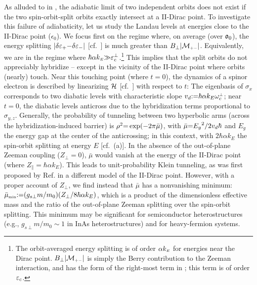 \documentclass[aps, showpacs, twocolumn, notitlepage, superscriptaddress]{revtex4-1}
\begin{document}
As alluded to in , the adiabatic limit of two independent orbits does not exist if the two spin-orbit-split orbits exactly intersect at a II-Dirac point. To investigate this failure of adiabaticity, let us study the Landau levels at energies close to the II-Dirac point ($\epsilon_0$). We focus first on the regime where, on average (over $\mathfrak{o}_0$), the energy splitting $|\delta \varepsilon_+{-}\delta \varepsilon_-|$ [cf.\ ] is much greater than $B_\perp|{\cal M}_{\scriptscriptstyle{+-}}|$. Equivalently, we are in the regime where $\hbar\alpha k_{\scriptscriptstyle{E}}{\gg}\varepsilon_c^\perp$.\footnote{The orbit-averaged energy splitting is of order $\alpha k_{\scriptscriptstyle{E}}$ for energies near the Dirac point. $B_\perp|{\cal M}_{\scriptscriptstyle{+-}}|$ is simply the Berry contribution to the Zeeman interaction, and has the form of the right-most term in ; this term is of order $\varepsilon_c$.} This implies that the split orbits do not appreciably hybridize -- except in the vicinity of the II-Dirac point where orbits (nearly) touch.  Near this touching point (where $t{=}0$), the dynamics of a spinor electron is described by linearizing $\mathcal{H}$ [cf.\ ] with respect to $t$:
The eigenbasis of $\sigma_x$ corresponds to two diabatic levels with characteristic slope $v_d{:}{=}\hbar\alpha k_E\omega^{\scriptscriptstyle{\perp}}_c$; near $t{=}0$, the diabatic levels anticross  due to the hybridization terms proportional to $\sigma_{y,z}$. Generally, the probability of tunneling between two hyperbolic arms (across the hybridization-induced barrier) is  $\rho^2{=}\exp(-2\pi\bar{\mu})$, with $\bar{\mu}{=}{E_g}^2/{2v_d \hbar}$ and $E_g$ the energy gap at the center of the anticrossing\cite{wittig_landauzener_2005,lifshitz_e.m._quantum_1991}; in this context,
with $2\hbar\alpha k_E$ the spin-orbit splitting at energy $E$ [cf.\ (a)]. In the absence of the out-of-plane Zeeman coupling ($Z_\perp{=}0$), $\bar{\mu}$ would vanish at the energy of the II-Dirac point (where $Z_{\parallel}=\hbar\alpha k_E$). This leads to unit-probability Klein tunneling, as was first proposed by Ref.  in a different model of the II-Dirac point. However, with a proper account of $Z_\perp$, we find instead that $\bar{\mu}$ has a nonvanishing minimum: $\bar{\mu}_{\scriptscriptstyle{\text{min}}}{:}{=} (g_{s\perp} m/m_0)(Z_\perp/8\hbar\alpha k_{E})$, which is a product of the dimensionless effective mass and the ratio of the out-of-plane Zeeman splitting over the spin-orbit splitting. This minimum may be significant for semiconductor heterostructures (e.g.,  $g_{s\perp}m/m_0{\sim} 1$ in InAs heterostructures\cite{pakmehr_g-factor_2015}) and  for heavy-fermion systems.
\end{document}
